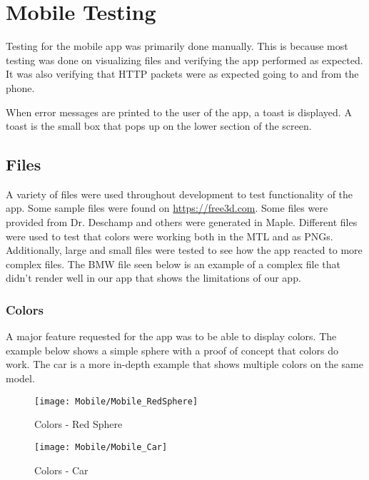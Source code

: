 
\section{Mobile Testing}
    Testing for the mobile app was primarily done manually. This is because most testing was done on visualizing files and verifying the app performed as expected.  It was also verifying that HTTP packets were as expected going to and from the phone.

    When error messages are printed to the user of the app, a toast is displayed.  A toast is the small box that pops up on the lower section of the screen.

    \subsection{Files}
        A variety of files were used throughout development to test functionality of the app. Some sample files were found on \url{https://free3d.com}. Some files were provided from Dr. Deschamp and others were generated in Maple. Different files were used to test that colors were working both in the MTL and as PNGs. Additionally, large and small files were tested to see how the app reacted to more complex files. The BMW file seen below is an example of a complex file that didn't render well in our app that shows the limitations of our app.
        
        \subsubsection{Colors}
        
            A major feature requested for the app was to be able to display colors. The example below shows a simple sphere with a proof of concept that colors do work. The car is a more in-depth example that shows multiple colors on the same model.
            
            \begin{figure}[H]
                \texttt{[image: Mobile/Mobile\_RedSphere]}
                \centering
                \caption{Colors - Red Sphere}
                \label{fig:mobileRedSphere}
            \end{figure}

            \begin{figure}[H]
                \texttt{[image: Mobile/Mobile\_Car]}
                \centering
                \caption{Colors - Car}
                \label{fig:mobileCar}
            \end{figure}
        
